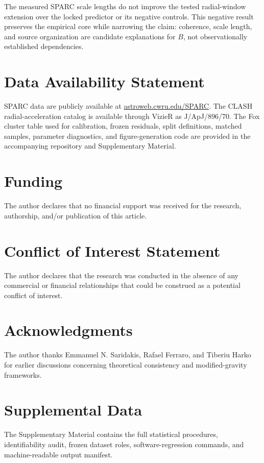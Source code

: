 \documentclass[utf8]{FrontiersinHarvard}
\begin{document}
The measured SPARC scale lengths do not improve the tested radial-window extension over the locked predictor or its negative controls. This negative result preserves the empirical core while narrowing the claim: coherence, scale length, and source organization are candidate explanations for \(B\), not observationally established dependencies.

\section*{Data Availability Statement}

SPARC data are publicly available at \href{http://astroweb.cwru.edu/SPARC/}{astroweb.cwru.edu/SPARC}. The CLASH radial-acceleration catalog is available through VizieR as J/ApJ/896/70. The Fox cluster table used for calibration, frozen residuals, split definitions, matched samples, parameter diagnostics, and figure-generation code are provided in the accompanying repository and Supplementary Material.

\section*{Funding}

The author declares that no financial support was received for the research, authorship, and/or publication of this article.

\section*{Conflict of Interest Statement}

The author declares that the research was conducted in the absence of any commercial or financial relationships that could be construed as a potential conflict of interest.

\section*{Acknowledgments}

The author thanks Emmanuel N. Saridakis, Rafael Ferraro, and Tiberiu Harko for earlier discussions concerning theoretical consistency and modified-gravity frameworks.

\section*{Supplemental Data}

The Supplementary Material contains the full statistical procedures, identifiability audit, frozen dataset roles, software-regression commands, and machine-readable output manifest.
\end{document}
